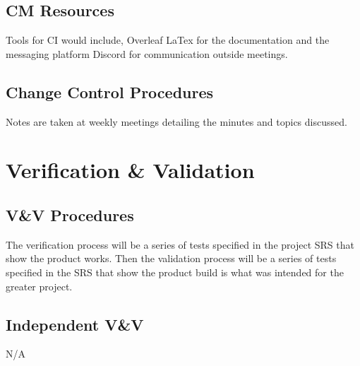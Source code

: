 \documentclass[letterpaper,12pt,oneside,listof=totoc]{scrreprt}
\begin{document}
\section{CM Resources}
Tools for CI would include, Overleaf LaTex for the documentation and the messaging platform Discord for communication outside meetings.

\section{Change Control Procedures}
Notes are taken at weekly meetings detailing the minutes and topics discussed.

\chapter{Verification \& Validation}

\section{V\&V Procedures}
The verification process will be a series of tests specified in the project SRS that show the product works. Then the validation process will be a series of tests specified in the SRS that show the product build is what was intended for the greater project.

\section{Independent V\&V}
N/A
\end{document}
